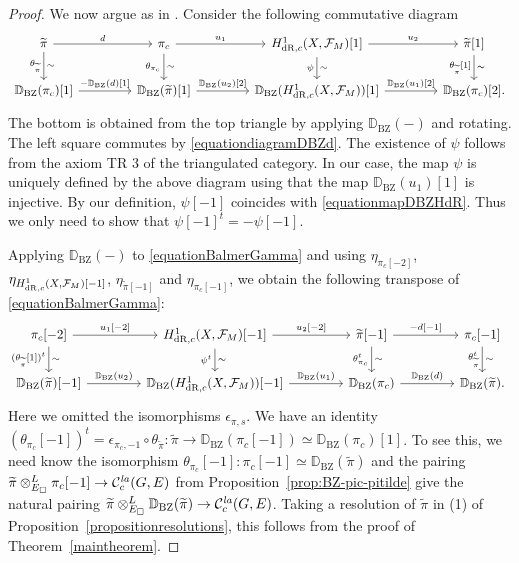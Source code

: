 \documentclass[a4paper,10pt]{amsart}
\theoremstyle{remark}
\theoremstyle{definition}
\theoremstyle{plain}
\numberwithin{equation}{section}
\newcommand{\bbD}{{\mathbb D}}
\newcommand{\calC}{{\mathcal C}}
\newcommand{\calF}{{\mathcal F}}
\newcommand{\dR}{{\rm dR}}
\newcommand{\la}{{\it la}}
\newcommand{\BZ}{\ensuremath{\mathrm{BZ}}}
\begin{document}
\begin{proof}
	We now argue as in \cite[Thm.~1.6]{balmer2000triangularWittI}. Consider the following commutative diagram
	\begin{equation}\label{equationBalmerGamma}
		\begin{tikzcd}[column sep=4.2em]
			\widetilde{\pi}\arrow[r,"d"]\arrow[d,"\theta_{\widetilde{\pi}}"',"\sim"]
			& \pi_c\arrow[r,"u_1"]\arrow[d, "\theta_{\pi_c}"',"\sim"]
			& H^1_{\dR,c}(X,\calF_M)[1]\arrow[r,"u_2"]\arrow[d,"\sim","\psi"']
			& \widetilde{\pi}[1]\arrow[d,"{\theta_{\widetilde{\pi}}[1]}"',"\sim"]
			\\
			\bbD_{\BZ}(\pi_c)[1]\arrow[r,"{-\bbD_{\BZ}(d)[1]}"]
			& \bbD_{\BZ}(\widetilde{\pi})[1]\arrow[r,"{\bbD_{\BZ}(u_2)[2]}"]
			& \bbD_{\BZ}(H^1_{\dR,c}(X,\calF_M))[1]\arrow[r,"{\bbD_{\BZ}(u_1)[2]}"]
			& \bbD_{\BZ}(\pi_c)[2].
		\end{tikzcd}
	\end{equation}
	The bottom is obtained from the top triangle by applying $\bbD_{\BZ}(-)$ and rotating. The left square commutes by \eqref{equationdiagramDBZd}. The existence of $\psi$ follows from the axiom TR 3 of the triangulated category. In our case, the map $\psi$ is uniquely defined by the above diagram using that the map $\bbD_{\BZ}(u_1)[1]$ is injective. By our definition, $\psi[-1]$ coincides with \eqref{equationmapDBZHdR}. Thus we only need to show that $\psi[-1]^{t}=-\psi[-1]$. 
	
	
	Applying $\bbD_{\BZ}(-)$ to \eqref{equationBalmerGamma} and using $\eta_{\pi_c[-2]}$, $\eta_{H^1_{\dR,c}(X,\calF_M)[-1]}$, $\eta_{\widetilde{\pi}[-1]}$ and $\eta_{\pi_c[-1]}$, we obtain the following transpose of \eqref{equationBalmerGamma}:
	\begin{equation}\label{equationBalmerGammatranspose}
		\begin{tikzcd}[column sep=4.2em]
			\pi_c[-2]\arrow[r,"{u_1[-2]}"]\arrow[d, "{(\theta_{\widetilde{\pi}}[1])^t}"',"\sim"]
			& H^1_{\dR,c}(X,\calF_M)[-1]\arrow[r,"{u_2[-2]}"]\arrow[d,"\sim","{\psi^t}"']
			& \widetilde{\pi}[-1]\arrow[r,"{-d[-1]}"]\arrow[d,"{\theta_{\pi_c}^t}"',"\sim"]
			& \pi_c[-1]\arrow[d,"{\theta_{\widetilde{\pi}}^t}"',"\sim"]
			\\
			\bbD_{\BZ}(\widetilde{\pi})[-1]\arrow[r,"{\bbD_{\BZ}(u_2)}"]
			& \bbD_{\BZ}(H^1_{\dR,c}(X,\calF_M))[-1]\arrow[r,"{\bbD_{\BZ}(u_1)}"]
			& \bbD_{\BZ}(\pi_c)\arrow[r,"{\bbD_{\BZ}(d)}"]
			& \bbD_{\BZ}(\widetilde{\pi}).
		\end{tikzcd}
	\end{equation}
	Here we omitted the isomorphisms $\epsilon_{\pi,s}$. We have an identity $(\theta_{\pi_c}[-1])^t=\epsilon_{\pi_c,-1}\circ\theta_{\widetilde{\pi}}:\widetilde{\pi}\to\bbD_{\BZ}(\pi_c[-1])\simeq \bbD_{\BZ}(\pi_c)[1]$. To see this, we need know the isomorphism $\theta_{\pi_c}[-1]:\pi_c[-1]\simeq \bbD_{\BZ}(\widetilde{\pi})$ and the pairing $\widetilde{\pi}\otimes_{E_{\square}}^L\pi_c[-1]\to \calC_{c}^{\la}(G,E)$ from Proposition~\ref{prop:BZ-pic-pitilde} give the natural pairing $\widetilde{\pi}\otimes_{E_{\square}}^L\bbD_{\BZ}(\widetilde{\pi})\to \calC_{c}^{\la}(G,E)$. Taking a resolution of $\widetilde{\pi}$ in (1) of Proposition~\ref{propositionresolutions}, this follows from the proof of Theorem~\ref{maintheorem}.


\end{proof}
\end{document}
